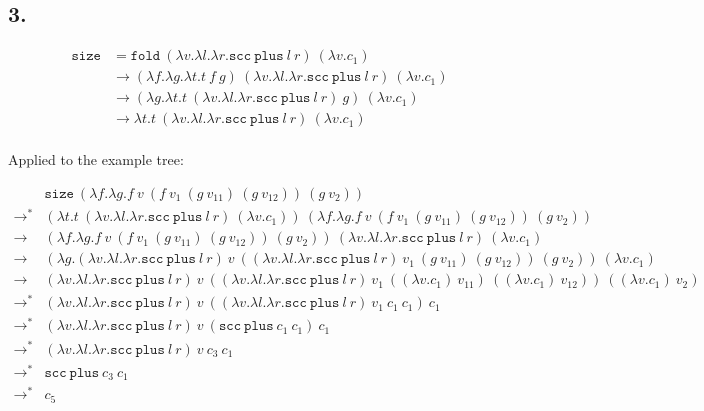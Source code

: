 \documentclass[13pt, a4paper]{article}
\begin{document}
\subsection*{3.} %
\[
\begin{aligned}
\texttt{size} &= \texttt{fold}\ (\lambda v.\lambda l. \lambda r.\texttt{scc}\ \texttt{plus}\ l\ r)\ (\lambda v.c_1) \\
&\to (\lambda f.\lambda g.\lambda t.t\ f\ g)\ (\lambda v.\lambda l. \lambda r.\texttt{scc}\ \texttt{plus}\ l\ r)\ (\lambda v.c_1) \\
&\to (\lambda g.\lambda t.t\ (\lambda v.\lambda l. \lambda r.\texttt{scc}\ \texttt{plus}\ l\ r)\ g)\ (\lambda v.c_1) \\
&\to \lambda t.t\ (\lambda v.\lambda l. \lambda r.\texttt{scc}\ \texttt{plus}\ l\ r)\ (\lambda v.c_1) \\
\end{aligned}
\]

Applied to the example tree:

\[
\begin{array}{llr}
& \texttt{size}\ (\lambda f.\lambda g.f\ v\ (f\ v_1\ (g\ v_{11})\ (g\ v_{12}))\ (g\ v_2)) \\
\to^* & (\lambda t.t\ (\lambda v.\lambda l. \lambda r.\texttt{scc}\ \texttt{plus}\ l\ r)\ (\lambda v.c_1))\ (\lambda f.\lambda g.f\ v\ (f\ v_1\ (g\ v_{11})\ (g\ v_{12}))\ (g\ v_2)) \\
\to & (\lambda f.\lambda g.f\ v\ (f\ v_1\ (g\ v_{11})\ (g\ v_{12}))\ (g\ v_2))\ (\lambda v.\lambda l. \lambda r.\texttt{scc}\ \texttt{plus}\ l\ r)\ (\lambda v.c_1) \\
\to & (\lambda g.(\lambda v.\lambda l. \lambda r.\texttt{scc}\ \texttt{plus}\ l\ r)\ v\ ((\lambda v.\lambda l. \lambda r.\texttt{scc}\ \texttt{plus}\ l\ r)\ v_1\ (g\ v_{11})\ (g\ v_{12}))\ (g\ v_2))\ (\lambda v.c_1) \\
\to & (\lambda v.\lambda l. \lambda r.\texttt{scc}\ \texttt{plus}\ l\ r)\ v\ ((\lambda v.\lambda l. \lambda r.\texttt{scc}\ \texttt{plus}\ l\ r)\ v_1\ ((\lambda v.c_1)\ v_{11})\ ((\lambda v.c_1)\ v_{12}))\ ((\lambda v.c_1)\ v_2) \\
\to^* & (\lambda v.\lambda l. \lambda r.\texttt{scc}\ \texttt{plus}\ l\ r)\ v\ ((\lambda v.\lambda l. \lambda r.\texttt{scc}\ \texttt{plus}\ l\ r)\ v_1\ c_1\ c_1)\ c_1 \\
\to^* & (\lambda v.\lambda l. \lambda r.\texttt{scc}\ \texttt{plus}\ l\ r)\ v\ (\texttt{scc}\ \texttt{plus}\ c_1\ c_1)\ c_1 \\
\to^* & (\lambda v.\lambda l. \lambda r.\texttt{scc}\ \texttt{plus}\ l\ r)\ v\ c_3\ c_1 \\
\to^* & \texttt{scc}\ \texttt{plus}\ c_3\ c_1 \\
\to^* & c_5 \\
\end{array}
\]
\end{document}

